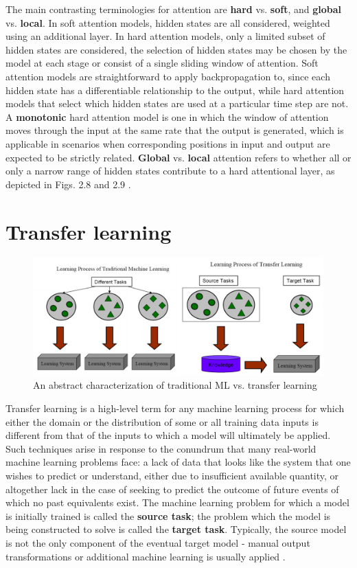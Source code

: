 The main contrasting terminologies for attention are \textbf{hard} vs. \textbf{soft}, and \textbf{global} vs. \textbf{local}. In soft attention models, hidden states are all considered, weighted using an additional layer. In hard attention models, only a limited subset of hidden states are considered, the selection of hidden states may be chosen by the model at each stage or consist of a single sliding window of attention. Soft attention models are straightforward to apply backpropagation to, since each hidden state has a differentiable relationship to the output, while hard attention models that select which hidden states are used at a particular time step are not. A \textbf{monotonic} hard attention model is one in which the window of attention moves through the input at the same rate that the output is generated, which is applicable in scenarios when corresponding positions in input and output are expected to be strictly related. \textbf{Global} vs. \textbf{local} attention refers to whether all or only a narrow range of hidden states contribute to a hard attentional layer, as depicted in Figs. 2.8 and 2.9 \parencite{Luong2015}. 

\section{Transfer learning}

\begin{figure}[t]
\includegraphics[width=12cm]{images/transfer_learning.png}
\centering
\caption{An abstract characterization of traditional ML vs. transfer learning}
\end{figure}

Transfer learning is a high-level term for any machine learning process for which either the domain or the distribution of some or all training data inputs is different from that of the inputs to which a model will ultimately be applied. Such techniques arise in response to the conundrum that many real-world machine learning problems face: a lack of data that looks like the system that one wishes to predict or understand, either due to insufficient available quantity, or altogether lack in the case of seeking to predict the outcome of future events of which no past equivalents exist. The machine learning problem for which a model is initially trained is called the \textbf{source task}; the problem which the model is being constructed to solve is called the \textbf{target task}. Typically, the source model is not the only component of the eventual target model - manual output transformations or additional machine learning is usually applied \parencite{Pan2010}.

